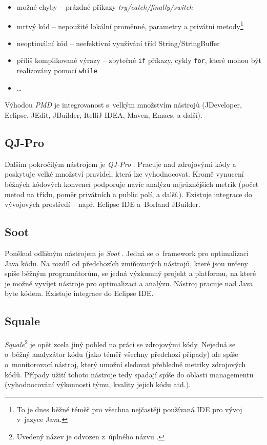 \begin{itemize}
\item možné chyby -- prázdné příkazy \emph{try/catch/finally/switch}
\item mrtvý kód -- nepoužité lokální proměnné, parametry a privátní metody\footnote{To je dnes běžné téměř pro všechna nejčastěji používaná IDE pro vývoj v~jazyce Java.}
\item neoptimální kód -- neefektivní využívání tříd String/StringBuffer
\item příliš komplikované výrazy -- zbytečné \verb+if+ příkazy, cykly \verb+for+, které mohou být realizovány pomocí \verb+while+
\item \ldots
\end{itemize}

Výhodou \emph{PMD} je integrovanost s~velkým množstvím nástrojů (JDeveloper, Eclipse, JEdit, JBuilder, ItelliJ IDEA, Maven, Emacs, a další).

\subsection{QJ-Pro}
Dalším pokročilým nástrojem je \emph{QJ-Pro} \cite{existingtools:qjpro}. Pracuje nad zdrojovými kódy a poskytuje velké množství pravidel, která lze vyhodnocovat. Kromě vynucení běžných kódových konvencí podporuje navíc analýzu nejrůznějších metrik (počet metod na třídu, poměr privátních a public polí, a další.). Existuje integrace do vývojových prostředí -- např. Eclipse IDE a~Borland JBuilder.

\subsection{Soot}
Poněkud odlišným nástrojem je \emph{Soot} \cite{existingtools:soot}. Jedná se o~framework pro optimalizaci Java kódu. Na rozdíl od předchozích zmiňovaných nástrojů, které jsou určeny spíše běžným programátorům, se jedná výzkumný projekt a platformu, na které je možné vyvíjet nástroje pro optimalizaci a analýzu. Nástroj pracuje nad Java byte kódem. Existuje integrace do Eclipse IDE.

\subsection{Squale}
\emph{Squale}\footnote{Uvedený název je odvozen z~úplného názvu .} \cite{existingtools:squale} je opět zcela jiný pohled na práci se zdrojovými kódy. Nejedná se o~běžný analyzátor kódu (jako téměř všechny předchozí případy) ale spíše o~monitorovací nástroj, který umožní sledovat přehledně metriky zdrojových kódů. Případy užití tohoto nástroje tedy spadají spíše do oblasti managementu (vyhodnocování výkonnosti týmu, kvality jejich kódu atd.).
